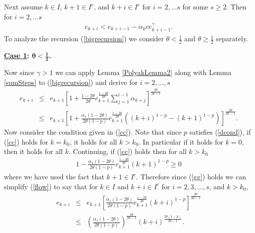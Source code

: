 Next assume $k\in I$, $k+1\in I^c$, and $k+i\in I^c$ for $i=2,\ldots s$ for some $s\geq 2$. Then for $i=2,\ldots s$
\begin{eqnarray}\label{bigrecursion}
e_{k+i}< e_{k+i-1}-\alpha_kc e_{k+i-1}^\gamma.
\end{eqnarray}
To analyze the recursion (\ref{bigrecursion}) we consider $\theta<\frac{1}{2}$ and $\theta\geq \frac{1}{2}$ separately.

\noindent 
{\bf \underline{Case 1}: $\boldsymbol{\theta<\frac{1}{2}}$.} 

\noindent
 Now since $\gamma> 1$ we can apply Lemma \ref{PolyakLemma2} along with Lemma \ref{sumSteps} to (\ref{bigrecursion}) and derive for $i=2,\ldots,s$
\begin{eqnarray}
e_{k+i}
&\leq& 
e_{k+1}
\left[
1+\frac{1-2\theta}{2\theta}e_{k+1}^{\frac{1-2\theta}{2\theta}}\sum_{j=1}^{i-1}\alpha_{k+j}
\right]^{\frac{2\theta}{2\theta-1}}
\nonumber\\\label{flow}
&\leq&
e_{k+1}
\left[
1+\frac{\alpha_1(1-2\theta)}{2\theta(1-p)}e_{k+1}^{\frac{1-2\theta}{2\theta}}
\left(
(k+i)^{1-p}
-(k+1)^{1-p}
\right)
\right]^{\frac{2\theta}{2\theta-1}}.
\end{eqnarray}
Now consider the condition given in (\ref{cc}).
Note that since $p$ satisfies (\ref{dcond}), if (\ref{cc}) holds for $k=k_0$, it holds for all $k>k_0$. In particular if it holds for $k=0$, then it holds for all $k$. Continuing, 
if (\ref{cc}) holds then for all $k>k_0$
\begin{eqnarray}
	1-\frac{\alpha_1(1-2\theta)}{2\theta(1-p)}e_{k+1}^{\frac{1-2\theta}{2\theta}}(k+1)^{1-p}\geq 0\label{gg}
\end{eqnarray}
where we have used the fact that $k+1\in I^c$. Therefore since (\ref{gg}) holds we can simplify (\ref{flow}) to say that for $k\in I$ and $k+i\in I^c$ for $i=2,3,\ldots,s$, and $k>k_0$,
\begin{eqnarray}
e_{k+i}&\leq& e_{k+1}
\left[\frac{\alpha_1(1-2\theta)}{2\theta(1-p)}e_{k+1}^{\frac{1-2\theta}{2\theta}}
(k+i)^{1-p}
\right]^{\frac{2\theta}{2\theta-1}}
\nonumber\\
&\leq&
\left(\frac{\alpha_1(1-2\theta)}{2\theta(1-p)}\right)^{\frac{2\theta}{2\theta-1}}
(k+i)^{\frac{2\theta(1-p)}{2\theta-1}}
\label{late}.
\end{eqnarray}

